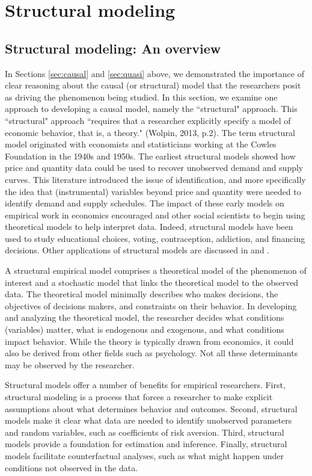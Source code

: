 \section{Structural modeling} \label{sec:struct}

\subsection{Structural modeling: An overview}
In Sections \ref{sec:causal} and \ref{sec:quasi} above, we demonstrated the importance of clear reasoning about the causal (or structural) model that the researchers posit as driving the phenomenon being studied.
In this section, we examine one approach to developing a causal model, namely the ``structural" approach.
This ``structural" approach ``requires that a researcher explicitly specify a model of economic behavior, that is, a theory." (Wolpin, 2013, p.2).
The term structural model originated with economists and statisticians working at the Cowles Foundation in the 1940s and 1950s.
The earliest structural models showed how price and quantity data could be used to recover unobserved demand and supply curves. 
This literature introduced the issue of identification, and more specifically the idea that (instrumental) variables beyond price and quantity were needed to identify demand and supply schedules. 
The impact of these early models on empirical work in economics encouraged and other social scientists to begin using theoretical models to help interpret data.
Indeed, structural models have been used to study educational choices, voting, contraception, addiction, and financing decisions. 
Other applications of structural models are discussed in \citet{Reiss:2007ej} and \citet{Reiss:2011go}.

A structural empirical model comprises a theoretical model of the phenomenon of interest and a stochastic model that links the theoretical model to the observed data.
The theoretical model minimally describes who makes decisions, the objectives of decisions makers, and constraints on their behavior.
In developing and analyzing the theoretical model, the researcher decides what conditions (variables) matter,  what is endogenous and exogenous, and what conditions impact behavior.
While the theory is typically drawn from economics, it could also be derived from other fields such as psychology.
Not all these determinants may be observed by the researcher.

Structural models offer a number of benefits for empirical researchers.
First, structural modeling is a process that forces a researcher to make explicit assumptions about what determines behavior and outcomes. 
Second, structural models make it clear what data are needed to identify unobserved parameters and random variables, such as coefficients of risk aversion.
Third, structural models provide a foundation for estimation and inference. 
Finally, structural models facilitate counterfactual analyses, such as what might happen under conditions not observed in the data. 
 
